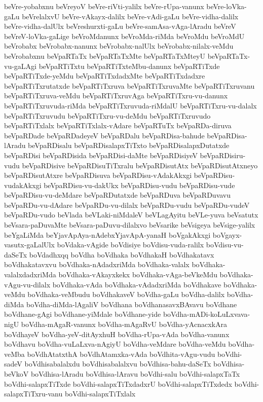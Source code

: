 {beVre-yobabxnu
beVreyoV
beVre-riVti-yalilx
beVre-rUpa-vanunx
beVre-loVka-gaLu
beVrelalxvU
beVre-vAkayx-dalilx
beVre-vAdi-gaLu
beVre-vidha-dalilx
beVre-vidha-dalUlx
beVreshurxti-gaLu
beVre-samAsa-vAga-lAradu
beVreV
beVreV-loVka-gaLige
beVroMdanunx
beVroMda-riMda
beVroMdu
beVroMdU
beVrobabx
beVrobabx-nanunx
beVrobabx-nalUlx
beVrobabx-nilalx-veMdu
beVrobabxnu
beVpaRTaTx
beVpaRTaTxMte
beVpaRTaTxMteyU
beVpaRTaTx-vu-gaLAgi
beVpaRTiTxtu
beVpaRTiTxteMbu-danunx
beVpaRTiTxde
beVpaRTiTxde-yeMdu
beVpaRTiTxdadxMte
beVpaRTiTxdadxre
beVpaRTiTxrutatxde
beVpaRTiTxruva
beVpaRTiTxruvaMte
beVpaRTiTxruvanu
beVpaRTiTxruva-veMdu
beVpaRTiTxruvAga
beVpaRTiTxru-vu-danunx
beVpaRTiTxruvuda-riMda
beVpaRTiTxruvuda-riMdalU
beVpaRTiTxru-vu-dalalx
beVpaRTiTxruvudu
beVpaRTiTxru-vu-deMdu
beVpaRTiTxruvudo
beVpaRTiTxlalx
beVpaRTiTxlalx-vAdare
beVpaRTuTx
beVpaRDa-diruva
beVpaRDade
beVpaRDadeyeV
beVpaRDalu
beVpaRDisa-bahude
beVpaRDisa-lAradu
beVpaRDisalu
beVpaRDisalapxTiTxto
beVpaRDisalapxDutatxde
beVpaRDisi
beVpaRDisida
beVpaRDisi-daMte
beVpaRDisiyeV
beVpaRDisiru-vudu
beVpaRDisive
beVpaRDisuTiTxralu
beVpaRDisutAtx
beVpaRDisutAtxneyo
beVpaRDisutAtxre
beVpaRDisuva
beVpaRDisu-vAdakAkxgi
beVpaRDisu-vudakAkxgi
beVpaRDisu-vu-dakUkx
beVpaRDisu-vudu
beVpaRDisu-vude
beVpaRDisu-vu-deMdare
beVpaRDutatxde
beVpaRDuva
beVpaRDuvavu
beVpaRDu-vu-dAdare
beVpaRDu-vu-dilalx
beVpaRDu-vudu
beVpaRDu-vudeV
beVpaRDu-vudo
beVlada
beVLaki-niMdaleV
beVLagAyitu
beVLe-yuva
beVsatutx
beVsara-paDuvaMte
beVsara-paDuvu-dilalxvo
beVsarike
beVsigeya
beVsige-yalilx
beYgaLiMda
beYjavApAya-nAdebxYjavApA-yanaH
boVgakAkxgi
boVgayx-vasutx-gaLalUlx
boVdaka-vAgide
boVdisiye
boVdisu-vuda-ralilx
boVdisu-vu-daSeTx
boVdadhxqq
boVdha
boVdhaka
boVdhakaH
boVdhakatavx
boVdhakatavxvu
boVdhaka-nAdadxriMda
boVdhaka-valalx
boVdhaka-valalxdadxriMda
boVdhaka-vAkayxkekx
boVdhaka-vAga-beVkeMdu
boVdhaka-vAgu-vu-dilalx
boVdhaka-vAda
boVdhaka-vAdadxriMda
boVdhakave
boVdhaka-veMdu
boVdhaka-veMbudu
boVdhakaveV
boVdha-gaLu
boVdha-dalilx
boVdha-diMda
boVdha-diMda-lAgaliV
boVdhana
boVdhanasavxBAvavu
boVdhane
boVdhane-gAgi
boVdhane-yiMdale
boVdhane-yide
boVdha-mADi-koLuLxvava-nigU
boVdha-mAgaR-vanunx
boVdha-mAgaRvU
boVdha-yAcnacxkAra
boVdhayeV
boVdha-yeV-ditAyxhuH
boVdha-rUpa-vAda
boVdha-vanunx
boVdhavu
boVdha-vuLaLxva-nAgiyU
boVdha-veMdare
boVdha-veMdu
boVdha-veMba
boVdhAtatxthA
boVdhAtamxka-vAda
boVdhita-vAgu-vudu
boVdhi-sadeV
boVdhisabalalxdu
boVdhisabalalxvu
boVdhisa-bahu-daSeTx
boVdhisa-beVkoV
boVdhisa-lAradu
boVdhisa-lAravu
boVdhi-salu
boVdhi-salapxTaTx
boVdhi-salapxTiTxde
boVdhi-salapxTiTxdadxrU
boVdhi-salapxTiTxdedx
boVdhi-salapxTiTxru-vanu
boVdhi-salapxTiTxlalx
}

